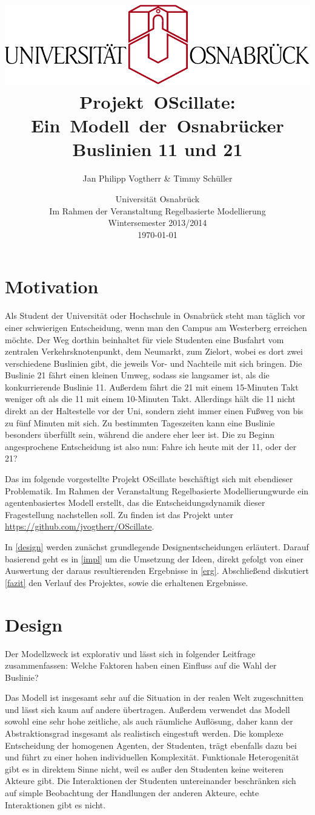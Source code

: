 \documentclass[12pt,a4paper]{scrartcl}
\author{Jan Philipp Vogtherr \& Timmy Schüller\vspace{0.5cm}}
\title{\includegraphics[scale=0.8]{unilogo.pdf}\vspace*{1cm}
\mbox{Projekt OScillate:} \mbox{Ein Modell der Osnabrücker} Buslinien 11 und 21\vspace{0.3cm}}
\date{Universität Osnabrück \\
Im Rahmen der Veranstaltung \glqq Regelbasierte Modellierung\grqq \\
\vspace*{0.4cm}
Wintersemester 2013/2014 \\
\today}
\begin{document}
\maketitle
\thispagestyle{empty}
\newpage
\tableofcontents
\newpage

\section{Motivation}
Als Student der Universität oder Hochschule in Osnabrück steht man täglich vor einer schwierigen Entscheidung, wenn man den Campus am Westerberg erreichen möchte. Der Weg dorthin beinhaltet für viele Studenten eine Busfahrt vom zentralen Verkehrsknotenpunkt, dem Neumarkt, zum Zielort, wobei es dort zwei verschiedene Buslinien gibt, die jeweils Vor- und Nachteile mit sich bringen. Die Buslinie 21 fährt einen kleinen Umweg, sodass sie langsamer ist, als die konkurrierende Buslinie 11. Außerdem fährt die 21 mit einem 15-Minuten Takt weniger oft als die 11 mit einem 10-Minuten Takt. Allerdings hält die 11 nicht direkt an der Haltestelle vor der Uni, sondern zieht immer einen Fußweg von bis zu fünf Minuten mit sich. Zu bestimmten Tageszeiten kann eine Buslinie besonders überfüllt sein, während die andere eher leer ist. Die zu Beginn angesprochene Entscheidung ist also nun: \glqq Fahre ich heute mit der 11, oder der 21?\grqq

Das im folgende vorgestellte Projekt OScillate beschäftigt sich mit ebendieser Problematik. Im Rahmen der Veranstaltung \glqq Regelbasierte Modellierung\grqq wurde ein agentenbasiertes Modell erstellt, das die Entscheidungsdynamik dieser Fragestellung nachstellen soll. Zu finden ist das Projekt unter \url{https://github.com/jvogtherr/OScillate}.

In \autoref{design} werden zunächst grundlegende Designentscheidungen erläutert. Darauf basierend geht es in \autoref{impl} um die Umsetzung der Ideen, direkt gefolgt von einer Auswertung der daraus resultierenden Ergebnisse in \autoref{erg}. Abschließend diskutiert \autoref{fazit} den Verlauf des Projektes, sowie die erhaltenen Ergebnisse.

\section{Design}\label{design}
Der Modellzweck ist explorativ und lässt sich in folgender Leitfrage zusammenfassen: \glqq Welche Faktoren haben einen Einfluss auf die Wahl der Buslinie?\grqq 

Das Modell ist insgesamt sehr auf die Situation in der realen Welt zugeschnitten und lässt sich kaum auf andere übertragen. Außerdem verwendet das Modell sowohl eine sehr hohe zeitliche, als auch räumliche Auflösung, daher kann der Abstraktionsgrad insgesamt als realistisch eingestuft werden. Die komplexe Entscheidung der homogenen Agenten, der Studenten, trägt ebenfalls dazu bei und führt zu einer hohen individuellen Komplexität. Funktionale Heterogenität gibt es in direktem Sinne nicht, weil es außer den Studenten keine weiteren Akteure gibt. Die Interaktionen der Studenten untereinander beschränken sich auf simple Beobachtung der Handlungen der anderen Akteure, echte Interaktionen gibt es nicht.
\end{document}
